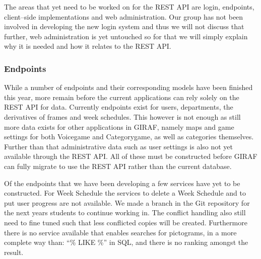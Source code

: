 The areas that yet need to be worked on for the REST API are login, endpoints, client--side implementations and web administration.
Our group has not been involved in developing the new login system and thus we will not discuss that further, web administration is yet untouched so for that we will simply explain why it is needed and how it relates to the REST API.

\subsubsection*{Endpoints}
While a number of endpoints and their corresponding models have been finished this year, more remain before the current applications can rely solely on the REST API for data.
Currently endpoints exist for users, departments, the derivatives of frames and week schedules.
This however is not enough as still more data exists for other applications in GIRAF, namely maps and game settings for both Voicegame and Categorygame, as well as categories themselves.
Further than that administrative data such as user settings is also not yet available through the REST API.
All of these must be constructed before GIRAF can fully migrate to use the REST API rather than the current database.

Of the endpoints that we have been developing a few services have yet to be constructed.
For Week Schedule the services to delete a Week Schedule and to put user progress are not available.
We made a branch in the Git repository for the next years students to continue working in.
The conflict handling also still need to fine tuned such that less conflicted copies will be created.
Furthermore there is no service available that enables searches for pictograms, in a more complete way than: ``\% LIKE \%'' in SQL, and there is no ranking amongst the result.

